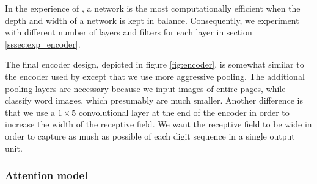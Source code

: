 In the experience of \textcite{InceptionV3}, a network is the most computationally efficient when the depth and width of a network is kept in balance. Consequently, we experiment with different number of layers and filters for each layer in section \ref{sssec:exp_encoder}.




The final encoder design, depicted in figure \ref{fig:encoder}, is somewhat similar to the encoder used by \textcite{FornesCnnCategorization} except that we use more aggressive pooling. The additional pooling layers are necessary because we input images of entire pages, while \textcite{FornesCnnCategorization} classify word images, which presumably are much smaller.
Another difference is that we use a $1 \times 5$ convolutional layer at the end of the encoder in order to increase the width of the receptive field. We want the receptive field to be wide in order to capture as mush as possible of each  digit sequence in a single output unit.





\subsubsection{Attention model}

